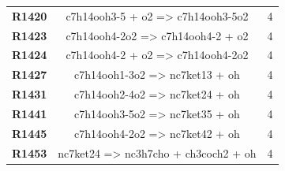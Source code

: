 \begin{longtable}{ccc}
\textbf{R1420} & c7h14ooh3-5 + o2 =\textgreater{} c7h14ooh3-5o2 & 4 \\
\textbf{R1423} & c7h14ooh4-2o2 =\textgreater{} c7h14ooh4-2 + o2 & 4 \\
\textbf{R1424} & c7h14ooh4-2 + o2 =\textgreater{} c7h14ooh4-2o2 & 4 \\
\textbf{R1427} & c7h14ooh1-3o2 =\textgreater{} nc7ket13 + oh & 4 \\
\textbf{R1431} & c7h14ooh2-4o2 =\textgreater{} nc7ket24 + oh & 4 \\
\textbf{R1441} & c7h14ooh3-5o2 =\textgreater{} nc7ket35 + oh & 4 \\
\textbf{R1445} & c7h14ooh4-2o2 =\textgreater{} nc7ket42 + oh & 4 \\
\textbf{R1453} & nc7ket24 =\textgreater{} nc3h7cho + ch3coch2 + oh & 4 \\
\hline
\end{longtable}